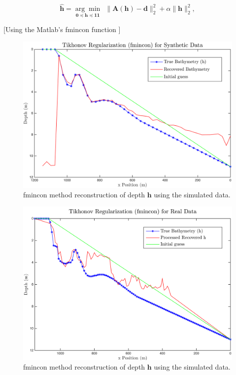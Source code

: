 \begin{equation}\label{LS-regBC}
\mathbf{\hat{h}} = \underset{\mathbf{0} \preceq \mathbf{h} \preceq \mathbf{11}}{\arg \min} \ \ \|  \mathbf{A}(\mathbf{h}) -  \mathbf{d} \|_2^2  +  \alpha \| \mathbf{h}\|_2^2,
\end{equation}

[Using the Matlab's fmincon function ]


\begin{figure}[H]
\center
\includegraphics[scale=0.46]{img/fmincon_simulated_25m.png} %
\caption{fmincon method reconstruction of depth $\mathbf{h}$ using the simulated data.}
\label{fmincon_simulated}
\end{figure}

\begin{figure}[H]
\center
\includegraphics[scale=0.46]{img/fmincon_real_data_oct09.png} %
\caption{fmincon method reconstruction of depth $\mathbf{h}$ using the simulated data.}
\label{fmincon_simulated}
\end{figure}





